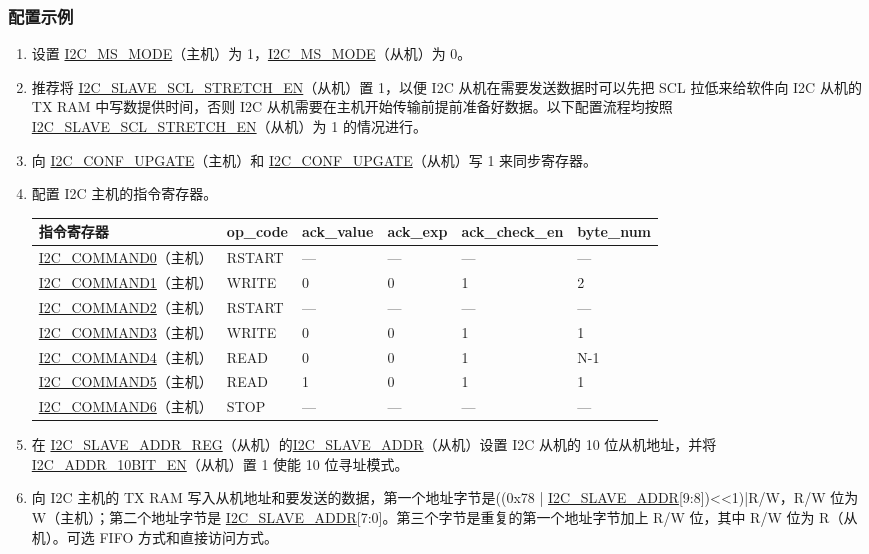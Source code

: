 \documentclass[main\_\_CN.tex]{subfiles}
\begin{document}
\subsubsection{配置示例}
\begin{enumerate}
\item 设置 \hyperref[fielddesc:I2CMSMODE]{I2C\_MS\_MODE}（主机）为 1，\hyperref[fielddesc:I2CMSMODE]{I2C\_MS\_MODE}（从机）为 0。
\item 推荐将 \hyperref[fielddesc:I2CSLAVESCLSTRETCHEN]{I2C\_SLAVE\_SCL\_STRETCH\_EN}（从机）置 1，以便 I2C 从机在需要发送数据时可以先把 SCL 拉低来给软件向 I2C 从机的 TX RAM 中写数提供时间，否则 I2C 从机需要在主机开始传输前提前准备好数据。以下配置流程均按照 \hyperref[fielddesc:I2CSLAVESCLSTRETCHEN]{I2C\_SLAVE\_SCL\_STRETCH\_EN}（从机）为 1 的情况进行。
\item 向 \hyperref[fielddesc:I2CCONFUPGATE]{I2C\_CONF\_UPGATE}（主机）和 \hyperref[fielddesc:I2CCONFUPGATE]{I2C\_CONF\_UPGATE}（从机）写 1 来同步寄存器。
\item 配置 I2C 主机的指令寄存器。
\begin{longtable}{ | p{4cm} | p{2cm} | p{2cm} | p{2cm} |p{2cm} | p{2cm} |}
\hline\rowcolor{lightgray}
指令寄存器& op\_code & ack\_value&ack\_exp&ack\_check\_en&byte\_num  \\ \hline
\hyperref[fielddesc:I2CCOMMAND0]{I2C\_COMMAND0}（主机）& RSTART& ---&---&---&---  \\ \hline
\hyperref[fielddesc:I2CCOMMAND1]{I2C\_COMMAND1}（主机）& WRITE& 0&0&1&2  \\ \hline
\hyperref[fielddesc:I2CCOMMAND2]{I2C\_COMMAND2}（主机）& RSTART& ---&---&---&---  \\ \hline
\hyperref[fielddesc:I2CCOMMAND3]{I2C\_COMMAND3}（主机）& WRITE& 0&0&1&1  \\ \hline
\hyperref[fielddesc:I2CCOMMAND4]{I2C\_COMMAND4}（主机）& READ& 0&0&1&N-1  \\ \hline
\hyperref[fielddesc:I2CCOMMAND5]{I2C\_COMMAND5}（主机）& READ& 1&0&1&1  \\ \hline
\hyperref[fielddesc:I2CCOMMAND6]{I2C\_COMMAND6}（主机）& STOP& ---&---&---&---  \\ \hline
\end{longtable}

\item 在 \hyperref[regdesc:I2CSLAVEADDRREG]{I2C\_SLAVE\_ADDR\_REG}（从机）的\hyperref[fielddesc:I2CSLAVEADDR]{I2C\_SLAVE\_ADDR}（从机）设置 I2C 从机的 10 位从机地址，并将 \hyperref[fielddesc:I2CADDR10BITEN]{I2C\_ADDR\_10BIT\_EN}（从机）置 1 使能 10 位寻址模式。
\item 向 I2C 主机的 TX RAM 写入从机地址和要发送的数据，第一个地址字节是((0x78 | \hyperref[fielddesc:I2CSLAVEADDR]{I2C\_SLAVE\_ADDR}[9:8])<<1)|R/W，R/W 位为 W（主机）；第二个地址字节是 \hyperref[fielddesc:I2CSLAVEADDR]{I2C\_SLAVE\_ADDR}[7:0]。第三个字节是重复的第一个地址字节加上 R/W 位，其中 R/W 位为 R（从机）。可选 FIFO 方式和直接访问方式。


\end{enumerate}
\end{document}

